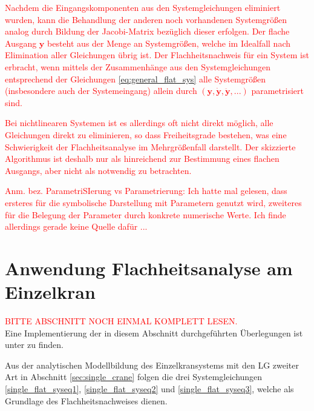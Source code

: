 \textcolor{red}{Nachdem die Eingangskomponenten aus den Systemgleichungen eliminiert wurden, kann die Behandlung der anderen noch vorhandenen Systemgrößen analog durch Bildung der Jacobi-Matrix bezüglich dieser erfolgen. Der  flache Ausgang $\mathbf{y}$ besteht aus der Menge an Systemgrößen, welche im Idealfall nach Elimination aller Gleichungen übrig ist. Der Flachheitsnachweis für ein System ist erbracht, wenn mittels der Zusammenhänge aus den Systemgleichungen entsprechend der Gleichungen \eqref{eq:general_flat_sys} alle Systemgrößen (insbesondere auch der Systemeingang) allein durch $(\mathbf{y}, \dot{\mathbf{y}}, \ddot{\mathbf{y}}, ...)$ parametrisiert sind.}

\textcolor{red}{Bei nichtlinearen Systemen ist es allerdings oft nicht direkt möglich, alle Gleichungen direkt zu eliminieren, so dass Freiheitsgrade bestehen, was eine Schwierigkeit der Flachheitsanalyse im Mehrgrößenfall darstellt. Der skizzierte Algorithmus ist deshalb nur als hinreichend zur Bestimmung eines flachen Ausgangs, aber nicht als notwendig zu betrachten.}

\textcolor{red}{Anm. bez. ParametriSIerung vs Parametrierung: Ich hatte mal gelesen, dass ersteres für die symbolische Darstellung mit Parametern genutzt wird, zweiteres für die Belegung der Parameter durch konkrete numerische Werte. Ich finde allerdings gerade keine Quelle dafür ...}

\section{Anwendung Flachheitsanalyse am Einzelkran}
\textcolor{red}{BITTE ABSCHNITT NOCH EINMAL KOMPLETT LESEN.}\\
Eine Implementierung der in diesem Abschnitt durchgeführten Überlegungen ist unter \cite[flatness\_notebooks/ODE\_flatness\_analysis\_single\_crane.ipynb]{SAGithub} zu finden.

Aus der analytischen Modellbildung des Einzelkransystems mit den LG zweiter Art in Abschnitt \ref{sec:single_crane} folgen die drei Systemgleichungen \eqref{single_flat_syseq1}, \eqref{single_flat_syseq2} und \eqref{single_flat_syseq3}, welche als Grundlage des Flachheitsnachweises dienen. 

